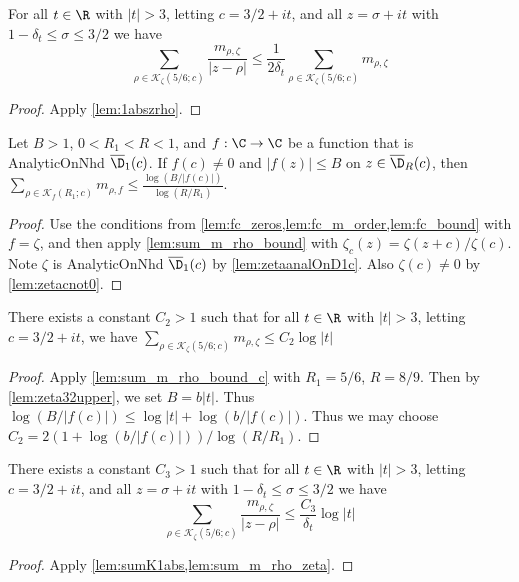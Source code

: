 \begin{lemma} \label{lem:sumK1abs}  \leanok
For all $t\in\R$ with $|t|>3$, letting $c=3/2+it$, and all $z=\sigma+it$ with $1-\delta_t \le \sigma \le 3/2$ we have
\[\sum_{\rho\in\mathcal K_{\zeta}(5/6;c)} \frac{m_{\rho,\zeta}}{|z-\rho|} \le \frac{1}{2\delta_t}\sum_{\rho\in\mathcal K_{\zeta}(5/6;c)}m_{\rho,\zeta}\]
\end{lemma}
\begin{proof}
\leanok
Apply \cref{lem:1abszrho}.
\end{proof}

\begin{lemma}\label{lem:sum_m_rho_bound_c}  \leanok
Let $B>1$, $0<R_1<R<1$, and $f:\C\to\C$ be a function that is AnalyticOnNhd $\overline{\D}_1(c)$. If $f(c)\neq0$ and $|f(z)|\le B$ on $z\in \overline{\D}_R(c)$, then $\sum_{\rho\in\mathcal K_f(R_1;c)} m_{\rho,f} \le \frac{\log(B/|f(c)|)}{\log(R/R_1)}$.
\end{lemma}
\begin{proof}
\leanok
Use the conditions from \cref{lem:fc_zeros,lem:fc_m_order,lem:fc_bound} with $f=\zeta$, and then apply \cref{lem:sum_m_rho_bound} with $\zeta_c(z) = \zeta(z+c)/\zeta(c)$. Note $\zeta$ is AnalyticOnNhd $\overline{\D}_1(c)$ by \cref{lem:zetaanalOnD1c}.
Also $\zeta(c)\neq0$ by \cref{lem:zetacnot0}.
\end{proof}

\begin{lemma} \label{lem:sum_m_rho_zeta}  \leanok
There exists a constant $C_2>1$ such that for all $t\in\R$ with $|t|>3$, letting $c=3/2+it$, we have
$\sum_{\rho\in\mathcal K_{\zeta}(5/6;c)}m_{\rho,\zeta} \le C_2 \log|t|$
\end{lemma}
\begin{proof}
\leanok
Apply \cref{lem:sum_m_rho_bound_c} with $R_1=5/6$, $R=8/9$.
Then by \cref{lem:zeta32upper}, we set $B = b|t|$.
Thus $\log(B/|f(c)|) \le \log|t| + \log(b/|f(c)|)$. Thus we may choose $C_2 = 2(1+\log(b/|f(c)|))/\log(R/R_1)$.
\end{proof}


\begin{lemma} \label{lem:sumKdeltatlogt}  \leanok
There exists a constant $C_3>1$ such that for all $t\in\R$ with $|t|>3$, letting $c=3/2+it$, and all $z=\sigma+it$ with $1-\delta_t \le \sigma \le 3/2$ we have
\[\sum_{\rho\in\mathcal K_{\zeta}(5/6;c)} \frac{m_{\rho,\zeta}}{|z-\rho|} \le \frac{C_3}{\delta_t} \log|t|\]
\end{lemma}
\begin{proof}
\leanok
Apply \cref{lem:sumK1abs,lem:sum_m_rho_zeta}.
\end{proof}


